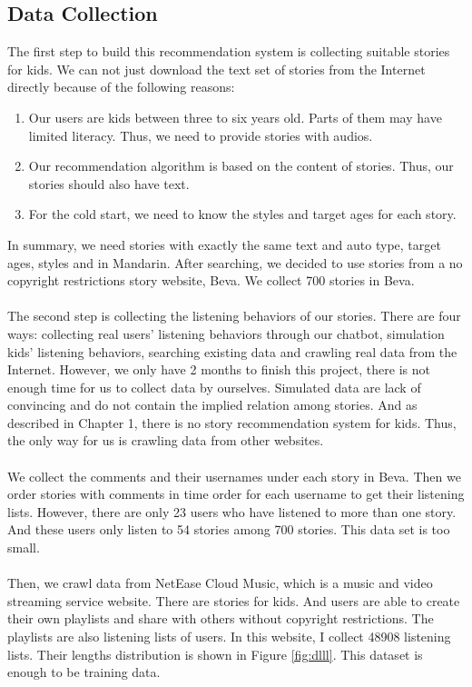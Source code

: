 \documentclass[sigconf]{acmart}
\begin{document}
\subsection{Data Collection}
The first step to build this recommendation system is collecting suitable stories for kids. We can not just download the text set of stories from the Internet directly because of the following reasons:
\begin{enumerate}
\item Our users are kids between three to six years old. Parts of them may have limited literacy. Thus, we need to provide stories with audios.
\item Our recommendation algorithm is based on the content of stories. Thus, our stories should also have text. 
\item For the cold start, we need to know the styles and target ages for each story.
\end{enumerate}
In summary, we need stories with exactly the same text and auto type, target ages, styles and in Mandarin. After searching, we decided to use stories from a 
no copyright restrictions story website, Beva. We collect 700 stories in Beva.
\\\\
The second step is collecting the listening behaviors of our stories. There are four ways: collecting real users' listening behaviors through our chatbot, simulation kids' listening behaviors, searching existing data and crawling real data from the Internet. However, we only have 2 months to finish this project, there is not enough time for us to collect data by ourselves. Simulated data are lack of convincing and do not contain the implied relation among stories. And as described in Chapter 1, there is no story recommendation system for kids. Thus, the only way for us is crawling data from other websites.
\\\\
We collect the comments and their usernames under each story in Beva. Then we order stories with comments in time order for each username to get their listening lists. However, there are only 23 users who have listened to more than one story. And these users only listen to 54 stories among 700 stories. This data set is too small.
\\\\
Then, we crawl data from NetEase Cloud Music, which is a music and video streaming service website. There are stories for kids. And users are able to create their own playlists and share with others without copyright restrictions. The playlists are also listening lists of users. In this website, I collect 48908 listening lists. Their lengths distribution is shown in Figure \ref{fig:dlll}. This dataset is enough to be training data.
\end{document}
